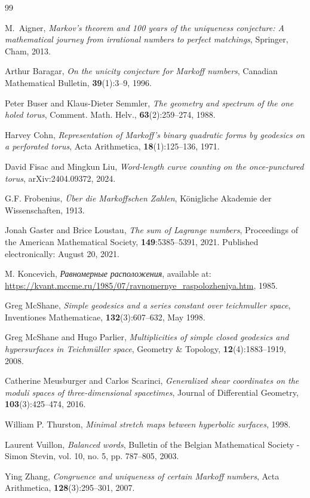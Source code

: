 \documentclass[12pt,reqno]{amsart}
\newcommand\textcyr[1]{{\fontencoding{OT2}\selectfont #1}}
\numberwithin{equation}{part}
\theoremstyle{plain}
\theoremstyle{definition}
\begin{document}
\begin{thebibliography}{99}

M.~Aigner, \textit{Markov's theorem and 100 years of the uniqueness conjecture: A mathematical journey from irrational numbers to perfect matchings}, Springer, Cham, 2013.

Arthur Baragar, \textit{On the unicity conjecture for Markoff numbers}, Canadian Mathematical Bulletin, \textbf{39}(1):3--9, 1996.

Peter Buser and Klaus-Dieter Semmler, \textit{The geometry and spectrum of the one holed torus}, Comment. Math. Helv., \textbf{63}(2):259--274, 1988.

Harvey Cohn, \textit{Representation of Markoff's binary quadratic forms by geodesics on a perforated torus}, Acta Arithmetica, \textbf{18}(1):125--136, 1971.

David Fisac and Mingkun Liu, \textit{Word-length curve counting on the once-punctured torus}, arXiv:2404.09372, 2024.

G.F. Frobenius, \textit{Über die Markoffschen Zahlen}, Königliche Akademie der Wissenschaften, 1913.

Jonah Gaster and Brice Loustau, \textit{The sum of Lagrange numbers}, Proceedings of the American Mathematical Society, \textbf{149}:5385--5391, 2021. Published electronically: August 20, 2021.

M. Koncevich, \textcyr{\textit{Равномерные расположения}}, available at: \url{https://kvant.mccme.ru/1985/07/ravnomernye_raspolozheniya.htm}, 1985.

Greg McShane, \textit{Simple geodesics and a series constant over teichmuller space}, Inventiones Mathematicae, \textbf{132}(3):607--632, May 1998.

Greg McShane and Hugo Parlier, \textit{Multiplicities of simple closed geodesics and hypersurfaces in Teichmüller space}, Geometry \& Topology, \textbf{12}(4):1883--1919, 2008.

Catherine Meusburger and Carlos Scarinci, \textit{Generalized shear coordinates on the moduli spaces of three-dimensional spacetimes}, Journal of Differential Geometry, \textbf{103}(3):425--474, 2016.

William P. Thurston, \textit{Minimal stretch maps between hyperbolic surfaces}, 1998.

Laurent Vuillon, \textit{Balanced words}, Bulletin of the Belgian Mathematical Society - Simon Stevin, vol. 10, no. 5, pp. 787--805, 2003.

Ying Zhang, \textit{Congruence and uniqueness of certain Markoff numbers}, Acta Arithmetica, \textbf{128}(3):295--301, 2007.

\end{thebibliography}

%
%
\end{document}
